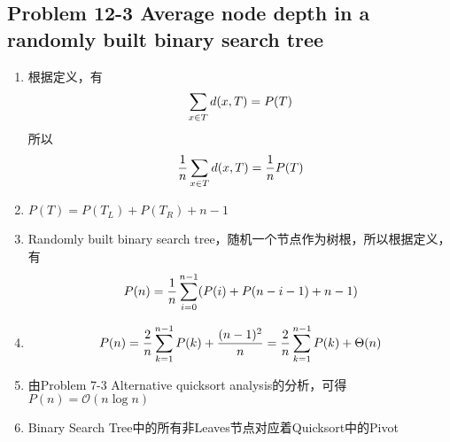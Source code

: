 \subsection*{Problem 12-3 Average node depth in a randomly built binary search tree}
\begin{enumerate}
	\item	根据定义，有
		\begin{equation} \notag
			\sum_{x \in T} d(x, T) = P(T)
		\end{equation}
		所以
		\begin{equation} \notag
			\frac{1}{n} \sum_{x \in T} d(x, T) = \frac{1}{n} P(T)
		\end{equation}
	\item	$P(T) = P(T_L) + P(T_R) + n - 1$
	\item	Randomly built binary search tree，随机一个节点作为树根，所以根据定义，有
		\begin{equation} \notag
			P(n) = \frac{1}{n} \sum_{i = 0}^{n - 1}(P(i) + P(n - i - 1) + n - 1)
		\end{equation}
	\item	\begin{equation} \notag
			P(n) = \frac{2}{n} \sum_{k = 1}^{n - 1} P(k) + \frac{(n - 1)^2}{n} = \frac{2}{n} \sum_{k = 1}^{n - 1} P(k) + \Theta(n)
		\end{equation}
	\item	由Problem 7-3 Alternative quicksort analysis的分析，可得$P(n) = \mathcal{O}(n \log{n})$
	\item	Binary Search Tree中的所有非Leaves节点对应着Quicksort中的Pivot
\end{enumerate}

